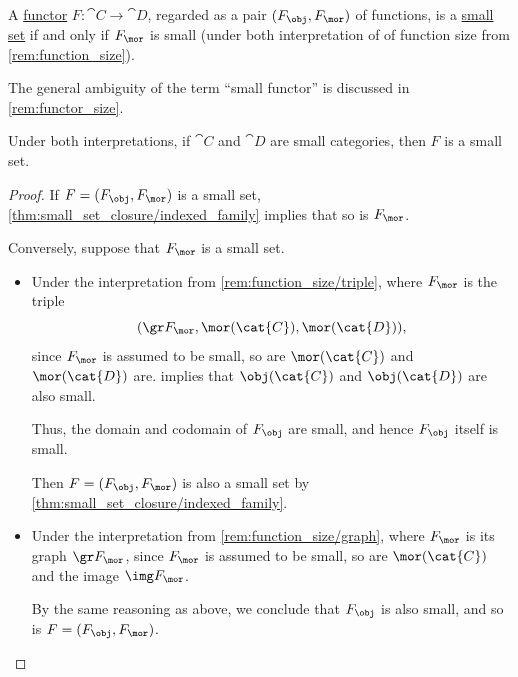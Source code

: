 \begin{proposition}\label{thm:small_functors}
  A \hyperref[def:functor]{functor} \( F: \cat{C} \to \cat{D} \), regarded as a pair \( (F_{\obj}, F_{\mor}) \) of functions, is a \hyperref[def:small_set]{small set} if and only if \( F_{\mor} \) is small (under both interpretation of of function size from \cref{rem:function_size}).
\end{proposition}
\begin{comments}
  \item The general ambiguity of the term \enquote{small functor} is discussed in \cref{rem:functor_size}.

  Under both interpretations, if \( \cat{C} \) and \( \cat{D} \) are small categories, then \( F \) is a small set.
\end{comments}
\begin{proof}
  \SufficiencySubProof* If \( F = (F_{\obj}, F_{\mor}) \) is a small set, \cref{thm:small_set_closure/indexed_family} implies that so is \( F_{\mor} \).

  \NecessitySubProof* Conversely, suppose that \( F_{\mor} \) is a small set.

  \begin{itemize}
    \item Under the interpretation from \cref{rem:function_size/triple}, where \( F_{\mor} \) is the triple
    \begin{equation*}
      (\gr F_{\mor}, \mor(\cat{C}), \mor(\cat{D})),
    \end{equation*}
    since \( F_{\mor} \) is assumed to be small, so are \( \mor(\cat{C}) \) and \( \mor(\cat{D}) \) are.  implies that \( \obj(\cat{C}) \) and \( \obj(\cat{D}) \) are also small.

    Thus, the domain and codomain of \( F_{\obj} \) are small, and hence \( F_{\obj} \) itself is small.

    Then \( F = (F_{\obj}, F_{\mor}) \) is also a small set by \cref{thm:small_set_closure/indexed_family}.

    \item Under the interpretation from \cref{rem:function_size/graph}, where \( F_{\mor} \) is its graph \( \gr F_{\mor} \), since \( F_{\mor} \) is assumed to be small, so are \( \mor(\cat{C}) \) and the image \( \img F_{\mor} \).

    By the same reasoning as above, we conclude that \( F_{\obj} \) is also small, and so is \( F = (F_{\obj}, F_{\mor}) \).
  \end{itemize}
\end{proof}

